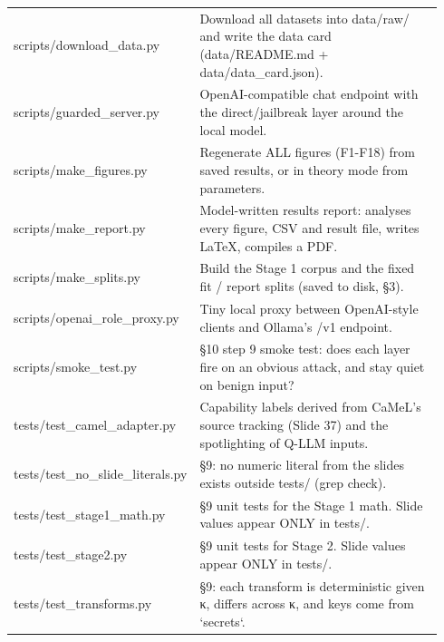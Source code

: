 \documentclass[11pt,a4paper]{article}
\begin{document}
\begin{small}
\begin{longtable}{p{0.36\linewidth}p{0.58\linewidth}}
scripts/download\_data.py & Download all datasets into data/raw/ and write the data card (data/README.md + data/data\_card.json). \\
scripts/guarded\_server.py & OpenAI-compatible chat endpoint with the direct/jailbreak layer around the local model. \\
scripts/make\_figures.py & Regenerate ALL figures (F1-F18) from saved results, or in theory mode from parameters. \\
scripts/make\_report.py & Model-written results report: analyses every figure, CSV and result file, writes LaTeX, compiles a PDF. \\
scripts/make\_splits.py & Build the Stage 1 corpus and the fixed fit / report splits (saved to disk, §3). \\
scripts/openai\_role\_proxy.py & Tiny local proxy between OpenAI-style clients and Ollama's /v1 endpoint. \\
scripts/smoke\_test.py & §10 step 9 smoke test: does each layer fire on an obvious attack, and stay quiet on benign input? \\
tests/test\_camel\_adapter.py & Capability labels derived from CaMeL's source tracking (Slide 37) and the spotlighting of Q-LLM inputs. \\
tests/test\_no\_slide\_literals.py & §9: no numeric literal from the slides exists outside tests/ (grep check). \\
tests/test\_stage1\_math.py & §9 unit tests for the Stage 1 math. Slide values appear ONLY in tests/. \\
tests/test\_stage2.py & §9 unit tests for Stage 2. Slide values appear ONLY in tests/. \\
tests/test\_transforms.py & §9: each transform is deterministic given κ, differs across κ, and keys come from `secrets`. \\
\bottomrule
\end{longtable}\end{small}
\end{document}
